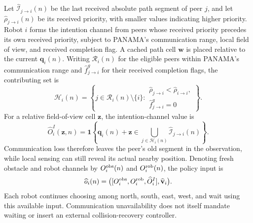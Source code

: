 \begin{panamaaddition}
Let $\widehat{\mathcal{I}}_{j\rightarrow i}(n)$ be the last received absolute
path segment of peer $j$, and let $\widehat{\rho}_{j\rightarrow i}(n)$ be its
received priority, with smaller values indicating higher priority. Robot $i$
forms the intention channel from peers whose received priority precedes its
own received priority, subject to PANAMA's communication range, local
field of view, and received completion flag. A cached path cell
$\mathbf{w}$ is placed relative to the current $\mathbf{q}_i(n)$.
Writing $\mathcal{R}_i(n)$ for the eligible peers within PANAMA's communication
range and $\widehat{f}_{j\rightarrow i}^{g}$ for their received completion
flags, the contributing set is
\begin{equation}
 \mathcal{H}_i(n)=\left\{j\in\mathcal{R}_i(n)\setminus\{i\}:
 \begin{array}{l}
  \widehat{\rho}_{j\rightarrow i}<\widehat{\rho}_{i\rightarrow i},\\
  \widehat{f}_{j\rightarrow i}^{g}=0
 \end{array}\right\}.
 \label{eq:panama-peer-set}
\end{equation}
For a relative field-of-view cell $\mathbf{z}$, the intention-channel value is
\begin{equation}
 \widehat{O}_i^I(\mathbf{z},n)=\mathbf{1}\!\left\{
 \mathbf{q}_i(n)+\mathbf{z}\in
 \bigcup_{j\in\mathcal{H}_i(n)}\widehat{\mathcal{I}}_{j\rightarrow i}(n)
 \right\}.
 \label{eq:panama-intention-mask}
\end{equation}
Communication loss therefore leaves the peer's old segment in the observation,
while local sensing can still reveal its actual nearby position. Denoting
fresh obstacle and robot channels by $O_i^{\rm obs}(n)$ and
$O_i^{\rm rob}(n)$, the policy input is
\begin{equation}
 \widehat{o}_i(n)=
 \big([O_i^{\rm obs},O_i^{\rm rob},\widehat{O}_i^I],
       \widehat{\mathbf{v}}_i\big).
 \label{eq:panama-observation}
\end{equation}
Each robot continues choosing among north, south, east, west, and wait using
this available input. Communication unavailability does not itself mandate
waiting or insert an external collision-recovery controller.


\end{panamaaddition}

